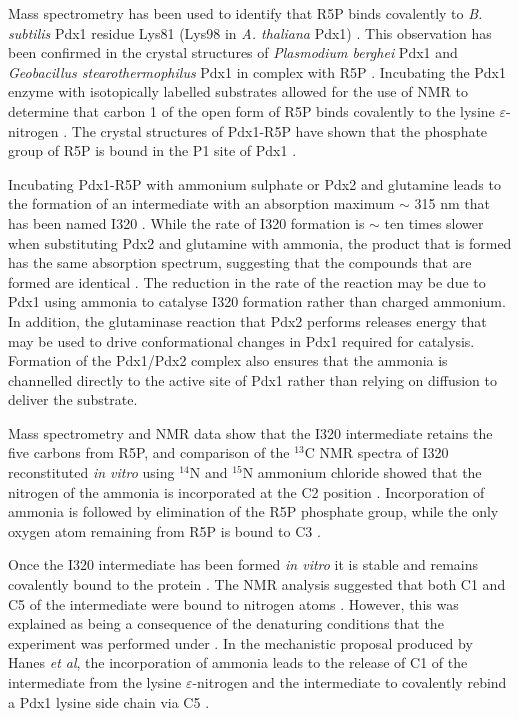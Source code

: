Mass spectrometry has been used to identify that R5P binds covalently to \textit{B. subtilis} Pdx1 residue Lys81 (Lys98 in \textit{A. thaliana} Pdx1) \cite{Raschle2007}. This observation has been confirmed in the crystal structures of \textit{Plasmodium berghei} Pdx1 and \textit{Geobacillus stearothermophilus} Pdx1 in complex with R5P \cite{Guedez2012,Smith2015}. Incubating the Pdx1 enzyme with isotopically labelled substrates allowed for the use of NMR to determine that carbon 1 of the open form of R5P binds covalently to the lysine $\varepsilon$-nitrogen \cite{Hanes2008b}. The crystal structures of Pdx1-R5P have shown that the phosphate group of R5P is bound in the P1 site of Pdx1 \cite{Guedez2012,Smith2015}.

Incubating Pdx1-R5P with ammonium sulphate or Pdx2 and glutamine leads to the formation of an intermediate with an absorption maximum $\sim$ 315 nm that has been named I320 \cite{Raschle2007,Hanes2008b}. While the rate of I320 formation is $\sim$ ten times slower when substituting Pdx2 and glutamine with ammonia, the product that is formed has the same absorption spectrum, suggesting that the compounds that are formed are identical \cite{Raschle2007}. The reduction in the rate of the reaction may be due to Pdx1 using ammonia to catalyse I320 formation rather than charged ammonium. In addition, the glutaminase reaction that Pdx2 performs releases energy that may be used to drive conformational changes in Pdx1 required for catalysis. Formation of the Pdx1/Pdx2 complex also ensures that the ammonia is channelled directly to the active site of Pdx1 rather than relying on diffusion to deliver the substrate.   

Mass spectrometry and NMR data show that the I320 intermediate retains the five carbons from R5P, and comparison of the $^{13}$C NMR spectra of I320 reconstituted \textit{in vitro} using $^{14}$N and $^{15}$N ammonium chloride showed that the nitrogen of the ammonia is incorporated at the C2 position \cite{Raschle2007,Hanes2008c}. Incorporation of ammonia is followed by elimination of the R5P phosphate group, while the only oxygen atom remaining from R5P is bound to C3 \cite{Raschle2007,Hanes2008a,Hanes2008b}.          

Once the I320 intermediate has been formed \textit{in vitro} it is stable and remains covalently bound to the protein \cite{Raschle2007}. The NMR analysis suggested that both C1 and C5 of the intermediate were bound to nitrogen atoms \cite{Hanes2008b}. However, this was explained as being a consequence of the denaturing conditions that the experiment was performed under \cite{Hanes2008b}. In the mechanistic proposal produced by Hanes \textit{et al}, the incorporation of ammonia leads to the release of C1 of the intermediate from the lysine $\varepsilon$-nitrogen and the intermediate to covalently rebind a Pdx1 lysine side chain via C5 \cite{Hanes2008b}.

